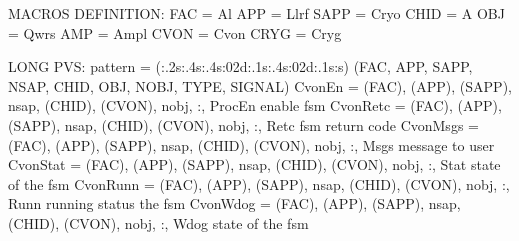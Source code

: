 \documentclass[letterpaper,10pt,english]{sphinxmanual}
\begin{document}
%
\begin{sphinxVerbatim}[commandchars=\\\{\}]
\PYGZsh{}MACROS DEFINITION:
\PYGZgt{} FAC = \PYGZdq{}Al\PYGZdq{}
\PYGZgt{} APP = \PYGZdq{}Llrf\PYGZdq{}
\PYGZgt{} SAPP = \PYGZdq{}Cryo\PYGZdq{}
\PYGZgt{} CHID = \PYGZdq{}A\PYGZdq{}
\PYGZgt{} OBJ = \PYGZdq{}Qwrs\PYGZdq{}
\PYGZgt{} AMP = \PYGZdq{}Ampl\PYGZdq{}
\PYGZgt{} CVON = \PYGZdq{}Cvon\PYGZdq{}
\PYGZgt{} CRYG = \PYGZdq{}Cryg\PYGZdq{}

\PYGZsh{}LONG PVS:
\PYGZgt{} pattern = (\PYGZob{}:.2s\PYGZcb{}\PYGZob{}:.4s\PYGZcb{}\PYGZob{}:.4s\PYGZcb{}\PYGZob{}:02d\PYGZcb{}\PYGZob{}:.1s\PYGZcb{}\PYGZus{}\PYGZob{}:.4s\PYGZcb{}\PYGZob{}:02d\PYGZcb{}\PYGZob{}:.1s\PYGZcb{}\PYGZob{}:s\PYGZcb{}) (FAC, APP, SAPP, NSAP, CHID, OBJ, NOBJ, TYPE, SIGNAL)
\PYGZdq{}CvonEn\PYGZdq{}             = \PYGZdl{}(FAC), \PYGZdl{}(APP), \PYGZdl{}(SAPP), \PYGZlt{}nsap\PYGZgt{}, \PYGZdl{}(CHID), \PYGZdl{}(CVON), \PYGZlt{}nobj\PYGZgt{}, \PYGZdq{}:\PYGZdq{}, \PYGZdq{}ProcEn\PYGZdq{}         \PYGZsh{}enable fsm
\PYGZdq{}CvonRetc\PYGZdq{}           = \PYGZdl{}(FAC), \PYGZdl{}(APP), \PYGZdl{}(SAPP), \PYGZlt{}nsap\PYGZgt{}, \PYGZdl{}(CHID), \PYGZdl{}(CVON), \PYGZlt{}nobj\PYGZgt{}, \PYGZdq{}:\PYGZdq{}, \PYGZdq{}Retc\PYGZdq{}           \PYGZsh{}fsm return code
\PYGZdq{}CvonMsgs\PYGZdq{}           = \PYGZdl{}(FAC), \PYGZdl{}(APP), \PYGZdl{}(SAPP), \PYGZlt{}nsap\PYGZgt{}, \PYGZdl{}(CHID), \PYGZdl{}(CVON), \PYGZlt{}nobj\PYGZgt{}, \PYGZdq{}:\PYGZdq{}, \PYGZdq{}Msgs\PYGZdq{}           \PYGZsh{}message to user
\PYGZdq{}CvonStat\PYGZdq{}           = \PYGZdl{}(FAC), \PYGZdl{}(APP), \PYGZdl{}(SAPP), \PYGZlt{}nsap\PYGZgt{}, \PYGZdl{}(CHID), \PYGZdl{}(CVON), \PYGZlt{}nobj\PYGZgt{}, \PYGZdq{}:\PYGZdq{}, \PYGZdq{}Stat\PYGZdq{}           \PYGZsh{}state of the fsm
\PYGZdq{}CvonRunn\PYGZdq{}           = \PYGZdl{}(FAC), \PYGZdl{}(APP), \PYGZdl{}(SAPP), \PYGZlt{}nsap\PYGZgt{}, \PYGZdl{}(CHID), \PYGZdl{}(CVON), \PYGZlt{}nobj\PYGZgt{}, \PYGZdq{}:\PYGZdq{}, \PYGZdq{}Runn\PYGZdq{}           \PYGZsh{}running status the fsm
\PYGZdq{}CvonWdog\PYGZdq{}           = \PYGZdl{}(FAC), \PYGZdl{}(APP), \PYGZdl{}(SAPP), \PYGZlt{}nsap\PYGZgt{}, \PYGZdl{}(CHID), \PYGZdl{}(CVON), \PYGZlt{}nobj\PYGZgt{}, \PYGZdq{}:\PYGZdq{}, \PYGZdq{}Wdog\PYGZdq{}           \PYGZsh{}state of the fsm


\end{sphinxVerbatim}
\end{document}
